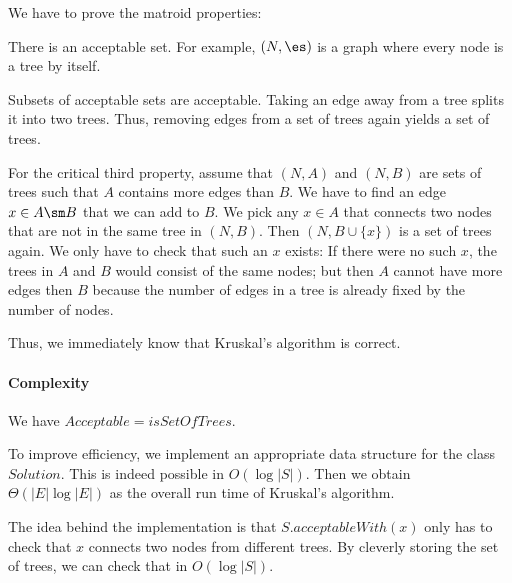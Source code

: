 We have to prove the matroid properties:
\begin{compactitem}
 \item There is an acceptable set. For example, $(N,\es)$ is a graph where every node is a tree by itself.
 \item Subsets of acceptable sets are acceptable. Taking an edge away from a tree splits it into two trees. Thus, removing edges from a set of trees again yields a set of trees.
 \item For the critical third property, assume that $(N,A)$ and $(N,B)$ are sets of trees such that $A$ contains more edges than $B$.
  We have to find an edge $x\in A\sm B$ that we can add to $B$.
  We pick any $x\in A$ that connects two nodes that are not in the same tree in $(N,B)$.
  Then $(N,B\cup\{x\})$ is a set of trees again.
  We only have to check that such an $x$ exists: If there were no such $x$, the trees in $A$ and $B$ would consist of the same nodes; but then $A$ cannot have more edges then $B$ because the number of edges in a tree is already fixed by the number of nodes.
\end{compactitem}

Thus, we immediately know that Kruskal's algorithm is correct.

\paragraph{Complexity}
We have $Acceptable=isSetOfTrees$.

To improve efficiency, we implement an appropriate data structure for the class $Solution$.
This is indeed possible in $O(\log|S|)$.
Then we obtain $\Theta(|E|\log|E|)$ as the overall run time of Kruskal's algorithm.

The idea behind the implementation is that $S.acceptableWith(x)$ only has to check that $x$ connects two nodes from different trees.
By cleverly storing the set of trees, we can check that in $O(\log|S|)$.

